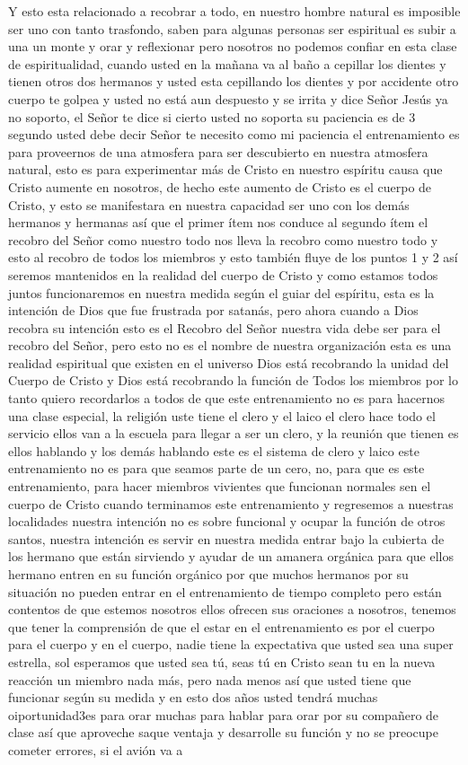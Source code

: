 \documentclass[12pt]{article}
\begin{document}
Y esto esta relacionado a recobrar a todo, en nuestro hombre natural es imposible ser uno con tanto trasfondo, saben para algunas personas ser espiritual es subir a una un monte y orar y reflexionar pero nosotros no podemos confiar en esta clase de espiritualidad, cuando usted en la mañana va al baño a cepillar los dientes y tienen otros dos hermanos y usted esta cepillando los dientes y por accidente otro cuerpo te golpea y usted no está aun despuesto y se irrita y dice Señor Jesús ya no soporto, el Señor te dice si cierto usted no soporta su paciencia es de 3 segundo usted debe decir Señor te necesito como mi paciencia el entrenamiento es para proveernos de una atmosfera para ser descubierto en nuestra atmosfera natural, esto es para experimentar más de Cristo en nuestro espíritu causa que Cristo aumente en nosotros, de hecho este aumento de Cristo es el cuerpo de Cristo, y esto se manifestara en nuestra capacidad ser uno con los demás hermanos y hermanas así que el primer ítem nos conduce al segundo ítem el recobro del Señor como nuestro todo nos lleva la recobro como nuestro todo y esto al recobro de todos los miembros y esto también fluye de los puntos 1 y 2 así seremos mantenidos en la realidad del cuerpo de Cristo y como estamos todos juntos funcionaremos en nuestra medida según el guiar del espíritu, esta es la intención de Dios que fue frustrada por satanás,  pero ahora cuando a Dios recobra su intención esto es el Recobro del Señor nuestra vida debe ser para el recobro del Señor, pero esto no es el nombre de nuestra organización esta es una realidad espiritual que existen en el universo Dios está recobrando la unidad del Cuerpo de Cristo y Dios está recobrando la función de Todos los miembros por lo tanto quiero recordarlos a todos de que este entrenamiento no es para hacernos una clase especial, la religión uste tiene el clero y el laico el clero hace todo el servicio ellos van a la escuela para llegar a ser un clero, y la reunión que tienen es ellos hablando y los demás hablando este es el sistema de clero y laico este entrenamiento no es para que seamos parte de un cero, no, para que es este entrenamiento, para hacer miembros vivientes que funcionan normales sen el cuerpo de Cristo cuando terminamos este entrenamiento y regresemos a nuestras localidades nuestra intención no es sobre funcional y ocupar la función de otros santos, nuestra intención es servir en nuestra medida entrar bajo la cubierta de los hermano que están sirviendo y ayudar de un amanera orgánica para que ellos hermano entren en su función orgánico por que muchos hermanos por su situación no pueden entrar en el entrenamiento de tiempo completo pero están contentos de que estemos nosotros ellos ofrecen sus oraciones a nosotros, tenemos que tener la comprensión de que el estar en el entrenamiento es por el cuerpo para el cuerpo y en el cuerpo, nadie tiene la expectativa que usted sea una super estrella, sol esperamos que usted sea tú, seas tú en Cristo sean tu en la nueva reacción un miembro nada más, pero nada menos así que usted tiene que funcionar según su medida y en esto dos años usted tendrá muchas oiportunidad3es para orar muchas para hablar para orar por su compañero de clase así que aproveche saque ventaja y desarrolle su función y no se preocupe cometer errores, si el avión va a 
\end{document}
